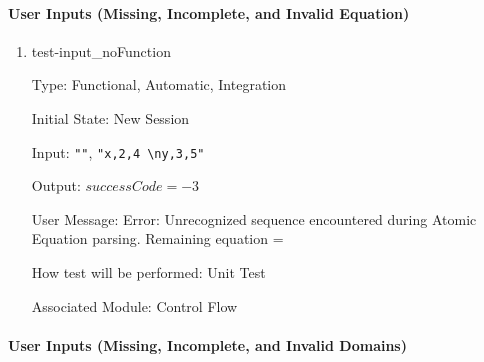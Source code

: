 \documentclass[12pt, titlepage]{article}
\begin{document}
\paragraph{User Inputs (Missing, Incomplete, and Invalid Equation)}

\begin{enumerate}
	
	\item{test-input\_noFunction}
	
	Type: Functional, Automatic, Integration
	
	Initial State: New Session
	
	Input: \texttt{""}, \texttt{"x,2,4 \textbackslash ny,3,5"}
	
	Output: $successCode = -3$
	
	User Message: Error: Unrecognized sequence encountered during Atomic 
	Equation parsing. Remaining equation = 
	
	How test will be performed: Unit Test
	
	Associated Module: Control Flow\\
	
\end{enumerate}

\paragraph{User Inputs (Missing, Incomplete, and Invalid Domains)}
\end{document}
